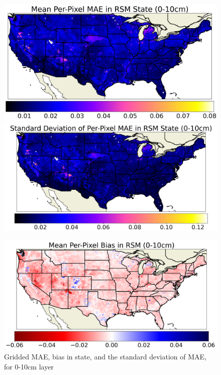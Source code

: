 \begin{figure}[hp!]
    \centering

    \includegraphics[width=.48\linewidth,draft=false]{figures/grid-eval_lstm-rsm-9_full/eval-grid_full_lstm-rsm-9_rsm-10_spatial-stats_abs-err_state-err-abs-mean.png}
    \includegraphics[width=.48\linewidth,draft=false]{figures/grid-eval_lstm-rsm-9_full/eval-grid_full_lstm-rsm-9_rsm-10_spatial-stats_abs-err_state-err-abs-stdev.png}

    \includegraphics[width=.48\linewidth,draft=false]{figures/grid-eval_lstm-rsm-9_full/eval-grid_full_lstm-rsm-9_rsm-10_spatial-stats_bias_state-err-bias-mean.png}

    \caption{Gridded MAE, bias in state, and the standard deviation of MAE, for 0-10cm layer}
    \label{lstm-rsm-9-grid-rsm-10}
\end{figure}

